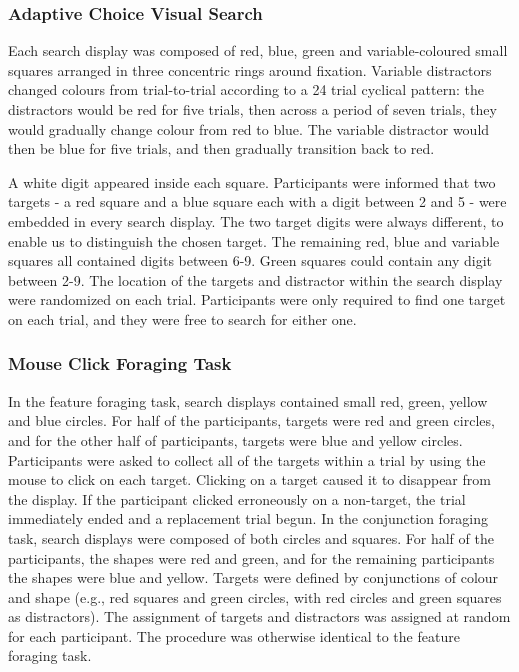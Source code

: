 \documentclass[twocolumn]{article}
\begin{document}
\subsubsection{Adaptive Choice Visual Search}

Each search display was composed of red, blue, green and variable-coloured small squares arranged in three concentric rings around fixation. Variable distractors changed colours from trial-to-trial according to a 24 trial cyclical pattern: the distractors would be red for five trials, then across a period of seven trials, they would gradually change colour from red to blue. The variable distractor would then be blue for five trials, and then gradually transition back to red. 

A white digit appeared inside each square. Participants were informed that two targets - a red square and a blue square each with a digit between 2 and 5 - were embedded in every search display. The two target digits were always different, to enable us to distinguish the chosen target. The remaining red, blue and variable squares all contained digits between 6-9. Green squares could contain any digit between 2-9. The location of the targets and distractor within the search display were randomized on each trial. Participants were only required to find one target on each trial, and they were free to search for either one.   

\subsubsection{Mouse Click Foraging Task}

In the feature foraging task, search displays contained small red, green, yellow and blue circles. For half of the participants, targets were red and green circles, and for the other half of participants, targets were blue and yellow circles. Participants were asked to collect all of the targets within a trial by using the mouse to click on each target. Clicking on a target caused it to disappear from the display. If the participant clicked erroneously on a non-target, the trial immediately ended and a replacement trial begun. In the conjunction foraging task, search displays were composed of both circles and squares. For half of the participants, the shapes were red and green, and for the remaining participants the shapes were blue and yellow. Targets were defined by conjunctions of colour and shape (e.g., red squares and green circles, with red circles and green squares as distractors). The assignment of targets and distractors was assigned at random for each participant. The procedure was otherwise identical to the feature foraging task. 
\end{document}
